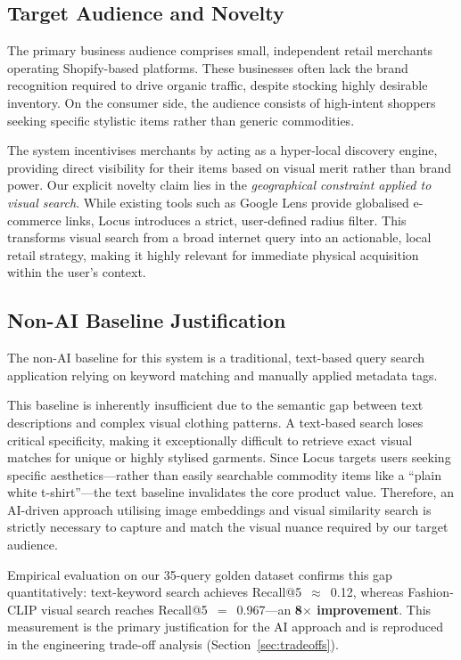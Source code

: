 \documentclass[12pt]{article}
\begin{document}
\subsection{Target Audience and Novelty}

The primary business audience comprises small, independent retail merchants operating Shopify-based platforms. These businesses often lack the brand recognition required to drive organic traffic, despite stocking highly desirable inventory. On the consumer side, the audience consists of high-intent shoppers seeking specific stylistic items rather than generic commodities.

The system incentivises merchants by acting as a hyper-local discovery engine, providing direct visibility for their items based on visual merit rather than brand power. Our explicit novelty claim lies in the \emph{geographical constraint applied to visual search}. While existing tools such as Google Lens provide globalised e-commerce links, Locus introduces a strict, user-defined radius filter. This transforms visual search from a broad internet query into an actionable, local retail strategy, making it highly relevant for immediate physical acquisition within the user's context.

\subsection{Non-AI Baseline Justification}

The non-AI baseline for this system is a traditional, text-based query search application relying on keyword matching and manually applied metadata tags.

This baseline is inherently insufficient due to the semantic gap between text descriptions and complex visual clothing patterns. A text-based search loses critical specificity, making it exceptionally difficult to retrieve exact visual matches for unique or highly stylised garments. Since Locus targets users seeking specific aesthetics---rather than easily searchable commodity items like a ``plain white t-shirt''---the text baseline invalidates the core product value. Therefore, an AI-driven approach utilising image embeddings and visual similarity search is strictly necessary to capture and match the visual nuance required by our target audience.

Empirical evaluation on our 35-query golden dataset confirms this gap quantitatively: text-keyword search achieves Recall@5~$\approx$~0.12, whereas Fashion-CLIP visual search reaches Recall@5~$=$~0.967---an \textbf{8$\times$ improvement}. This measurement is the primary justification for the AI approach and is reproduced in the engineering trade-off analysis (Section~\ref{sec:tradeoffs}).
\end{document}
